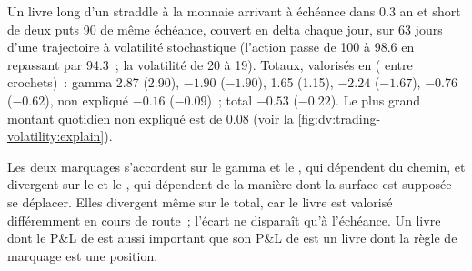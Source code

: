 \begin{example}\label{ex:dv:trading-volatility:book}
Un livre long d'un straddle à la monnaie arrivant à échéance dans 0.3 an et short de deux puts 90 de même échéance, couvert en delta chaque jour, sur 63 jours
d'une trajectoire à volatilité stochastique (l'action passe de 100 à 98.6 en repassant par 94.3~; la volatilité de 20 à 19). Totaux, valorisés en  ( entre crochets)~: gamma 2.87 (2.90),  $-1.90$ ($-1.90$),  1.65 (1.15),  $-2.24$ ($-1.67$),  $-0.76$ ($-0.62$), non expliqué
$-0.16$ ($-0.09$)~; total $-0.53$ ($-0.22$). Le plus grand montant quotidien non expliqué est de 0.08
(voir la \cref{fig:dv:trading-volatility:explain}).
\end{example}

Les deux marquages s'accordent sur le gamma et le , qui dépendent du chemin, et divergent sur le  et le , qui dépendent de la manière dont la surface est supposée
se déplacer. Elles divergent même sur le total, car le livre est valorisé différemment en cours de route~; l'écart ne disparaît qu'à l'échéance. Un livre
dont le P\&L de  est aussi important que son P\&L de  est un livre dont la règle de marquage est une position.

